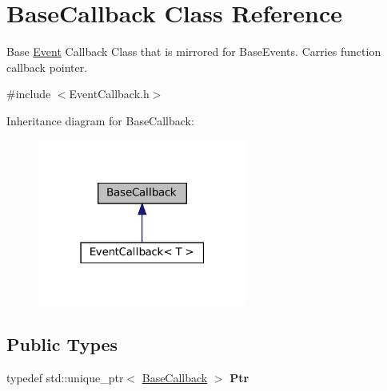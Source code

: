 \hypertarget{classBaseCallback}{}\section{Base\+Callback Class Reference}
\label{classBaseCallback}


Base \hyperlink{classEvent}{Event} Callback Class that is mirrored for Base\+Events. Carries function callback pointer.  




{\ttfamily \#include $<$Event\+Callback.\+h$>$}



Inheritance diagram for Base\+Callback\+:\nopagebreak
\begin{figure}[H]
\begin{center}
\leavevmode
\includegraphics[width=195pt]{classBaseCallback__inherit__graph}
\end{center}
\end{figure}
\subsection*{Public Types}
\begin{DoxyCompactItemize}
\item 
\mbox{\label{classBaseCallback_a20c1623e166841cea02948e54122690a}} 
typedef std\+::unique\+\_\+ptr$<$ \hyperlink{classBaseCallback}{Base\+Callback} $>$ {\bfseries Ptr}
\end{DoxyCompactItemize}
